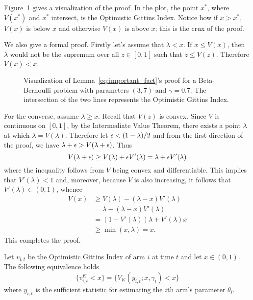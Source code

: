 \begin{myproof}[Proof.]
	Figure~\ref{fig:visaulize_gx_proof} gives a visualization of the proof. In the plot, the point $x^*$, where $V(x^*)$ and $x^*$ intersect, is the Optimistic Gittins Index. Notice how if $x > x^*$, $V(x)$ is below $x$ and otherwise $V(x)$ is above $x$; this is the crux of the proof.
	
	We also give a formal proof. Firstly let's assume that $\lambda < x$. If $x\le V(x)$, then $\lambda$ would not be the supremum over all $z \in [0,1]$ such that $ z \le V(z)$. Therefore $V(x) < x$.
	
	\begin{figure}
		\centering
		
		\caption{Visualization of Lemma~\ref{eq:important_fact}'s proof for a Beta-Bernoulli problem with parameters $(3,7)$ and $\gamma=0.7$. The intersection of the two lines represents the Optimistic Gittins Index.}
		\label{fig:visaulize_gx_proof}
	\end{figure}
	
	For the converse, assume $\lambda \ge x$. Recall that $V(z)$ is convex. Since $V$ is continuous on $[0,1]$, by the Intermediate Value Theorem, there exists a point $\lambda$ at which $\lambda =V(\lambda)$. Therefore let $\epsilon < (1-\lambda)/2$ and from the first direction of the proof, we have $\lambda + \epsilon > V(\lambda + \epsilon)$. Thus
	\[
	V(\lambda + \epsilon) \ge V(\lambda) + \epsilon V'(\lambda) = \lambda + \epsilon V'(\lambda)
	\]
	where the inequality follows from $V$ being convex and differentiable. This implies that $V'(\lambda) < 1$ and, moreover, because $V$ is also increasing, it follows that $V'(\lambda) \in (0,1)$, whence
	\begin{align*}
	V(x) & \ge V(\lambda) - (\lambda - x) V'(\lambda) \\
	& = \lambda - (\lambda - x) V'(\lambda) \\
	& = (1-V'(\lambda)) \lambda + V'(\lambda) x \\
	& \ge \min(x,\lambda) = x.
	\end{align*}
	This completes the proof.
\end{myproof}
\begin{corollary} \label{cor:equivalent_event}
	Let $v_{i,t}$ be the Optimistic Gittins Index of arm $i$ at time $t$ and let $x \in (0,1)$. The following equivalence holds
	\[
	\{v^K_{i,t} < x \} = \{V_K(y_{i,t}; x, \gamma_t) < x\}\]
	where $y_{i,t}$ is the sufficient statistic for estimating the $i$th arm's parameter $\theta_i$.
\end{corollary}
